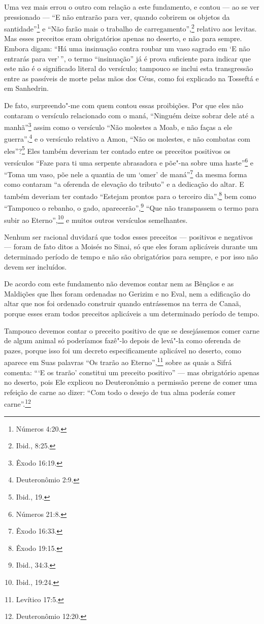 Uma vez mais errou o outro com relação a este fundamento, e contou ---
ao se ver pressionado --- ``E não entrarão para ver, quando cobrirem os
objetos da santidade''\footnote{Números 4:20.} e ``Não farão mais o trabalho de
carregamento'',\footnote{Ibid., 8:25.} relativo aos levitas\starr. Mas esses preceitos
eram obrigatórios apenas no deserto, e não para sempre. Embora digam:
``Há uma insinuação contra roubar um vaso sagrado em `E não entrarás
para ver'\,'', o termo ``insinuação'' já é prova suficiente para indicar
que este não é o significado literal do versículo; tampouco se inclui
esta transgressão entre as passíveis de morte pelas mãos dos Céus, como
foi explicado na Tosseftá\starr{} e em Sanhedrin\starr.

De fato, surpreendo"-me com quem contou essas proibições. Por que eles
não contaram o versículo relacionado com o maná, ``Ninguém deixe sobrar
dele até a manhã''\footnote{Êxodo 16:19.} assim como o versículo ``Não molestes a
Moab\starr, e não faças a ele guerra'',\footnote{Deuteronômio 2:9.} e o versículo
relativo a Amon\starr, ``Não os molestes, e não combatas com eles''?\footnote{Ibid.,
19.} Eles também deveriam ter contado entre os preceitos positivos os
versículos ``Faze para ti uma serpente abrasadora e põe"-na sobre uma
haste''\footnote{Números 21:8.} e ``Toma um vaso, põe nele a quantia de um `omer'
de maná''\footnote{Êxodo 16:33.} da mesma forma como contaram
``a oferenda de elevação do tributo'' e a dedicação do altar. E também
deveriam ter contado ``Estejam prontos para o terceiro dia'',\footnote{Êxodo
19:15.} bem como ``Tampouco o rebanho, o gado, aparecerão'',\footnote{Ibid.,
34:3.} ``Que não transpassem o termo para subir ao Eterno'',\footnote{Ibid.,
19:24.} e muitos outros versículos semelhantes.

Nenhum ser racional duvidará que todos esses preceitos --- positivos e
negativos --- foram de fato ditos a Moisés no Sinai, só que eles foram
aplicáveis durante um determinado período de tempo e não são
obrigatórios para sempre, e por isso não devem ser incluídos.

De acordo com este fundamento não devemos contar nem as Bênçãos e as Maldições que lhes foram ordenadas no Gerizim e no Eval\starr, nem a
edificação do altar que nos foi ordenado construir quando entrássemos
na terra de Canaã, porque esses eram todos preceitos aplicáveis a um
determinado período de tempo.

Tampouco devemos contar o preceito positivo de que se desejássemos
comer carne de algum animal só poderíamos fazê"-lo depois de levá"-la
como oferenda de pazes, porque isso foi um decreto especificamente
aplicável no deserto, como aparece em Suas palavras ``Os trarão ao
Eterno'',\footnote{Levítico 17:5.} sobre as quais a Sifrá\starr{} comenta: ```E os
trarão' constitui um preceito positivo'' --- mas obrigatório apenas no
deserto, pois Ele explicou no Deuteronômio a permissão perene de comer
uma refeição de carne ao dizer: ``Com todo o desejo de tua alma poderás
comer carne''.\footnote{Deuteronômio 12:20.}

